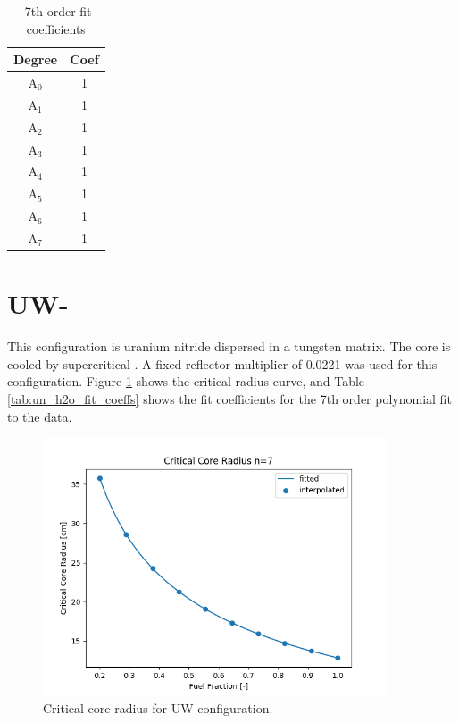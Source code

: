 \begin{table}[h]
  \centering
  \caption{\uox-\water 7th order fit coefficients}
  \begin{tabular}{cc}
    \toprule
     Degree & Coef\\ 
    \midrule                                  
    A$_0$  &  1\\
    A$_1$  &  1\\
    A$_2$  &  1\\
    A$_3$  &  1\\
    A$_4$  &  1\\
    A$_5$  &  1\\
    A$_6$  &  1\\
    A$_7$  &  1\\
  \end{tabular}
  \label{tab:uo2_h2o_fit_coeffs}
\end{table}



\section{UW-\water}
This configuration is uranium nitride dispersed in a tungsten matrix. The core
is cooled by supercritical \water. A fixed reflector multiplier of 0.0221 was
used for this configuration. Figure \ref{fig:core_r_un_h2o} shows the critical
radius curve, and Table \ref{tab:un_h2o_fit_coeffs} shows the fit coefficients
for the 7th order polynomial fit to the data.

\begin{figure}[h]
    \centering
    \includegraphics[width=4in]{../images/core_r_un_h2o.png}
\caption{Critical core radius for UW-\water configuration.}
\label{fig:core_r_un_h2o}
\end{figure}


